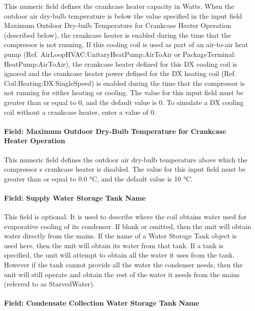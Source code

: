 This numeric field defines the crankcase heater capacity in Watts. When the outdoor air dry-bulb temperature is below the value specified in the input field Maximum Outdoor Dry-bulb Temperature for Crankcase Heater Operation (described below), the crankcase heater is enabled during the time that the compressor is not running. If this cooling coil is used as part of an air-to-air heat pump (Ref. AirLoopHVAC:UnitaryHeatPump:AirToAir or PackageTerminal: HeatPump:AirToAir), the crankcase heater defined for this DX cooling coil is ignored and the crankcase heater power defined for the DX heating coil (Ref. Coil:Heating:DX:SingleSpeed) is enabled during the time that the compressor is not running for either heating or cooling. The value for this input field must be greater than or equal to 0, and the default value is 0. To simulate a DX cooling coil without a crankcase heater, enter a value of 0.

\paragraph{Field: Maximum Outdoor Dry-Bulb Temperature for Crankcase Heater Operation}\label{field-maximum-outdoor-dry-bulb-temperature-for-crankcase-heater-operation}

This numeric field defines the outdoor air dry-bulb temperature above which the compressor s crankcase heater is disabled. The value for this input field must be greater than or equal to 0.0 °C, and the default value is 10 °C.

\paragraph{Field: Supply Water Storage Tank Name}\label{field-supply-water-storage-tank-name-000}

This field is optional. It is used to describe where the coil obtains water used for evaporative cooling of its condenser. If blank or omitted, then the unit will obtain water directly from the mains. If the name of a Water Storage Tank object is used here, then the unit will obtain its water from that tank. If a tank is specified, the unit will attempt to obtain all the water it uses from the tank. However if the tank cannot provide all the water the condenser needs, then the unit will still operate and obtain the rest of the water it needs from the mains (referred to as StarvedWater).

\paragraph{Field: Condensate Collection Water Storage Tank Name}\label{field-condensate-collection-water-storage-tank-name-2}

